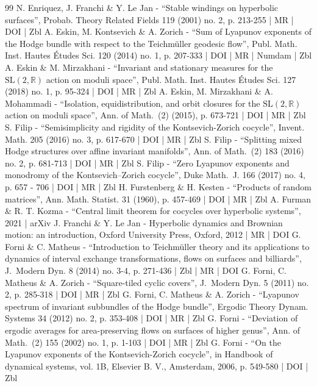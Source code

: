 \documentclass[10pt]{amsart}
\theoremstyle{plain}
\theoremstyle{definition}
\numberwithin{equation}{subsection}
\begin{document}
\begin{thebibliography}{99}
N. Enriquez, J. Franchi \& Y. Le Jan - “Stable windings on hyperbolic surfaces”, Probab. Theory Related Fields 119 (2001) no. 2, p. 213-255 | MR | DOI | Zbl
A. Eskin, M. Kontsevich \& A. Zorich - “Sum of Lyapunov exponents of the Hodge bundle with respect to the Teichmüller geodesic flow”, Publ. Math. Inst. Hautes Études Sci. 120 (2014) no. 1, p. 207-333 | DOI | MR | Numdam | Zbl
A. Eskin \& M. Mirzakhani - “Invariant and stationary measures for the $\mathrm{SL}(2,\mathbb{R})$ action on moduli space”, Publ. Math. Inst. Hautes Études Sci. 127 (2018) no. 1, p. 95-324 | DOI | MR | Zbl
A. Eskin, M. Mirzakhani \& A. Mohammadi - “Isolation, equidistribution, and orbit closures for the $\mathrm{SL}(2,\mathbb{R})$ action on moduli space”, Ann. of Math. (2) (2015), p. 673-721 | DOI | MR | Zbl
S. Filip - “Semisimplicity and rigidity of the Kontsevich-Zorich cocycle”, Invent. Math. 205 (2016) no. 3, p. 617-670 | DOI | MR | Zbl
S. Filip - “Splitting mixed Hodge structures over affine invariant manifolds”, Ann. of Math. (2) 183 (2016) no. 2, p. 681-713 | DOI | MR | Zbl
S. Filip - “Zero Lyapunov exponents and monodromy of the Kontsevich–Zorich cocycle”, Duke Math. J. 166 (2017) no. 4, p. 657 - 706 | DOI | MR | Zbl
H. Furstenberg \& H. Kesten - “Products of random matrices”, Ann. Math. Statist. 31 (1960), p. 457-469 | DOI | MR | Zbl
A. Furman \& R. T. Kozma - “Central limit theorem for cocycles over hyperbolic systems”, 2021 | arXiv
J. Franchi \& Y. Le Jan - Hyperbolic dynamics and Brownian motion: an introduction, Oxford University Press, Oxford, 2012 | MR | DOI
G. Forni \& C. Matheus - “Introduction to Teichmüller theory and its applications to dynamics of interval exchange transformations, flows on surfaces and billiards”, J. Modern Dyn. 8 (2014) no. 3-4, p. 271-436 | Zbl | MR | DOI
G. Forni, C. Matheus \& A. Zorich - “Square-tiled cyclic covers”, J. Modern Dyn. 5 (2011) no. 2, p. 285-318 | DOI | MR | Zbl
G. Forni, C. Matheus \& A. Zorich - “Lyapunov spectrum of invariant subbundles of the Hodge bundle”, Ergodic Theory Dynam. Systems 34 (2012) no. 2, p. 353-408 | DOI | MR | Zbl
G. Forni - “Deviation of ergodic averages for area-preserving flows on surfaces of higher genus”, Ann. of Math. (2) 155 (2002) no. 1, p. 1-103 | DOI | MR | Zbl
G. Forni - “On the Lyapunov exponents of the Kontsevich-Zorich cocycle”, in Handbook of dynamical systems, vol. 1B, Elsevier B. V., Amsterdam, 2006, p. 549-580 | DOI | Zbl

\end{thebibliography}
\end{document}
